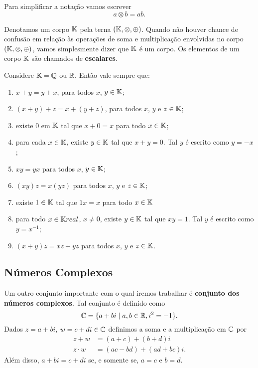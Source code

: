 Para simplificar a nota\c{c}\~ao vamos escrever
\[
	a \otimes b = ab.
\]

Denotamos um corpo $\mathbb{K}$ pela terna $(\mathbb{K}, \otimes, \oplus)$. Quando n\~ao houver chance de confus\~ao em rela\c{c}\~ao \`as opera\c{c}\~oes de soma e multiplica\c{c}\~ao envolvidas no corpo $(\mathbb{K}, \otimes, \oplus)$, vamos simplesmente dizer que $\mathbb{K}$ \'e um corpo. Os elementos de um corpo $\mathbb{K}$ s\~ao chamados de \textbf{escalares}.

Considere $\mathbb{K} = \mathbb{Q}$ ou $\mathbb{R}$. Então vale sempre que:
\begin{enumerate}
	\item $x + y = y + x$, para todos $x$, $y \in \mathbb{K}$;

	\item $(x + y) + z = x + (y + z)$, para todos $x$, $y$ e $z \in \mathbb{K}$;

	\item existe $0$ em $\mathbb{K}$ tal que $x + 0 = x$ para todo $x \in \mathbb{K}$;

	\item para cada $x \in \mathbb{K}$, existe $y \in \mathbb{K}$ tal que $x + y = 0$. Tal $y$ é escrito como $y = -x$;

	\item $xy = yx$ para todos $x$, $y \in \mathbb{K}$;

	\item $(xy)z = x(yz)$ para todos $x$, $y$ e $z \in \mathbb{K}$;

	\item existe $1 \in \mathbb{K}$ tal que $1x = x$ para todo $x \in \mathbb{K}$

	\item para todo $x \in \mathbb{K}real$, $x \ne 0$, existe $y \in \mathbb{K}$ tal que $xy =1$. Tal $y$ é escrito como $y = x^{-1}$;

	\item $(x + y)z = xz + yz$ para todos $x$, $y$ e $z \in \mathbb{K}$.
\end{enumerate}

\subsection{Números Complexos}
Um outro conjunto importante com o qual iremos trabalhar é \textbf{conjunto dos números complexos}. Tal conjunto \'e definido como
\[
	\mathbb{C} = \{a + bi \mid a, b \in \mathbb{R}, i^2 = -1\}.
\]
Dados $z = a + bi$, $w = c + di \in \mathbb{C}$ definimos a soma e a multiplica\c{c}\~ao em $\mathbb{C}$ por
\begin{align*}
	z + w &= (a + c) + (b + d)i\\
	z\cdot w &= (ac - bd) + (ad + bc)i.
\end{align*}
Al\'em disso, $a + bi = c + di$ se, e somente se, $a = c$ e $b = d$.

